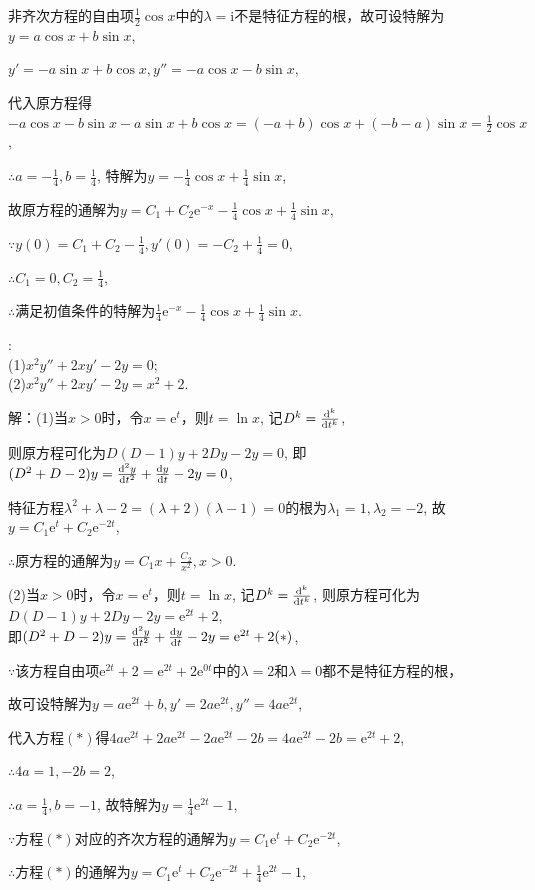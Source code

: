 \documentclass[12pt,UTF8,fleqn]{ctexart}
\newcommand{\md}[1]{\mathrm d#1}
\newcommand{\me}[0]{\mathrm e}
\newcommand{\m}[0]{\mathrm }
\begin{document}
\begin{enumerate}
非齐次方程的自由项$\frac12\cos x$中的$\lambda=\m i$不是特征方程的根，故可设特解为$y=a\cos x+b\sin x$,

$y'=-a\sin x+b\cos x,y''=-a\cos x-b\sin x$,

代入原方程得$-a\cos x-b\sin x-a\sin x+b\cos x=(-a+b)\cos x+(-b-a)\sin x=\frac12\cos x$,

$\therefore a=-\frac14,b=\frac14$, 特解为$y=-\frac14\cos x+\frac14\sin x$,

故原方程的通解为$y=C_1+C_2\me^{-x}-\frac14\cos x+\frac14\sin x$,

$\because y(0)=C_1+C_2-\frac14,y'(0)=-C_2+\frac14=0$,

$\therefore C_1=0,C_2=\frac14$,

$\therefore$满足初值条件的特解为$\frac14\me^{-x}-\frac14\cos x+\frac14\sin x$.

:\\
(1)$x^2y''+2xy'-2y=0$;\\
(2)$x^2y''+2xy'-2y=x^2+2$.

解：(1)当$x>0$时，令$x=\me^t$，则$t=\ln x$, 记$D^k=\frac{\md^k}{\md t^k}$,

则原方程可化为$D(D-1)y+2Dy-2y=0$, 即$(D^2+D-2)y=\frac{\md^2y}{\md t^2}+\frac{\md y}{\md t}-2y=0$,

特征方程$\lambda^2+\lambda-2=(\lambda+2)(\lambda-1)=0$的根为$\lambda_1=1,\lambda_2=-2$, 故$y=C_1\me^t+C_2\me^{-2t}$,

$\therefore$原方程的通解为$y=C_1x+\frac{C_2}{x^2},x>0$.

(2)当$x>0$时，令$x=\me^t$，则$t=\ln x$, 记$D^k=\frac{\md^k}{\md t^k}$, 则原方程可化为$D(D-1)y+2Dy-2y=\me^{2t}+2$,\\
即$(D^2+D-2)y=\frac{\md^2y}{\md t^2}+\frac{\md y}{\md t}-2y=\me^{2t}+2(*)$,

$\because$该方程自由项$\me^{2t}+2=\me^{2t}+2\me^{0t}$中的$\lambda=2$和$\lambda=0$都不是特征方程的根，

故可设特解为$y=a\me^{2t}+b,y'=2a\me^{2t},y''=4a\me^{2t}$,

代入方程$(*)$得$4a\me^{2t}+2a\me^{2t}-2a\me^{2t}-2b=4a\me^{2t}-2b=\me^{2t}+2$,

$\therefore 4a=1,-2b=2$,

$\therefore a=\frac14,b=-1$, 故特解为$y=\frac14\me^{2t}-1$,

$\because$方程$(*)$对应的齐次方程的通解为$y=C_1\me^t+C_2\me^{-2t}$,

$\therefore$方程$(*)$的通解为$y=C_1\me^t+C_2\me^{-2t}+\frac14\me^{2t}-1$,


\end{enumerate}
\end{document}
